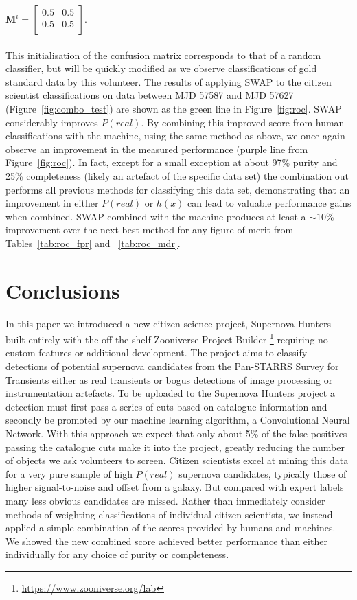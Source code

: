 \documentclass[a4paper,fleqn,usenatbib]{mnras}
\begin{document}
 $\bm{M}^i = \begin{bmatrix}
                        0.5&0.5\\
                        0.5&0.5 \\
                        \end{bmatrix}.$\\
\\
This initialisation of the confusion matrix corresponds to that of a random classifier, but will be quickly modified as we observe classifications of gold standard data by this volunteer.  The results of applying SWAP to the citizen scientist classifications on data between MJD 57587 and MJD 57627 (Figure~\ref{fig:combo_test}) are shown as the green line in Figure~\ref{fig:roc}.  SWAP considerably improves $P(real)$.  By combining this improved score from human classifications with the machine, using the same method as above, we once again observe an improvement in the measured performance (purple line from Figure~\ref{fig:roc}).  In fact, except for a small exception at about 97\% purity and 25\% completeness (likely an artefact of the specific data set) the combination out performs all previous methods for classifying this data set, demonstrating that an improvement in either $P(real)$ or $h(x)$ can lead to valuable performance gains when combined.  SWAP combined with the machine produces at least a $\sim10$\% improvement over the next best method for any figure of merit from Tables~\ref{tab:roc_fpr} and ~\ref{tab:roc_mdr}.

\section{Conclusions}
\label{sec:conclusions}


In this paper we introduced a new citizen science project, Supernova Hunters built entirely with the off-the-shelf Zooniverse Project Builder \footnote{\url{https://www.zooniverse.org/lab}} requiring no custom features or additional development.  The project aims to classify detections of potential supernova candidates from the Pan-STARRS Survey for Transients either as real transients or bogus detections of image processing or instrumentation artefacts.  To be uploaded to the Supernova Hunters project a detection must first pass a series of cuts based on catalogue information and secondly be promoted by our machine learning algorithm, a Convolutional Neural Network. With this approach we expect that only about 5\% of the false positives passing the catalogue cuts make it into the project, greatly reducing the number of objects we ask volunteers to screen.  Citizen scientists excel at mining this data for a very pure sample of high $P(real)$ supernova candidates, typically those of higher signal-to-noise and offset from a galaxy.  But compared with expert labels many less obvious candidates are missed.  Rather than immediately consider methods of weighting classifications of individual citizen scientists, we instead applied a simple combination of the scores provided by humans and machines.  We showed the new combined score achieved better performance than either individually for any choice of purity or completeness.
\end{document}
